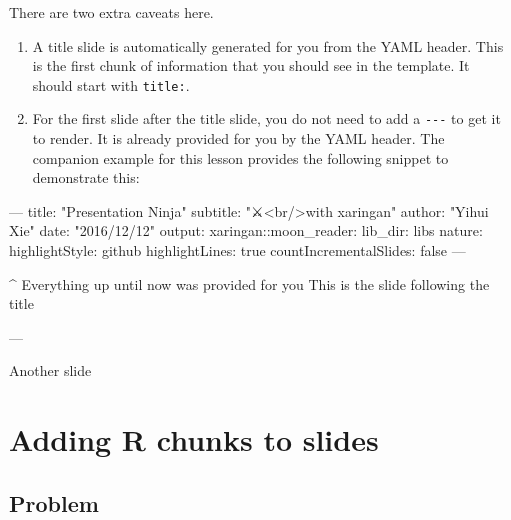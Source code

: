 \documentclass[]{book}
\newenvironment{Shaded}{\begin{snugshade}}{\end{snugshade}}
\newcommand{\ExtensionTok}[1]{#1}
\newcommand{\NormalTok}[1]{#1}
\newcommand{\StringTok}[1]{\textcolor[rgb]{0.31,0.60,0.02}{#1}}
\theoremstyle{definition}
\theoremstyle{definition}
\theoremstyle{definition}
\theoremstyle{remark}
\begin{document}
There are two extra caveats here.

\begin{enumerate}
\def\labelenumi{\arabic{enumi})}
\item
  A title slide is automatically generated for you from the YAML header.
  This is the first chunk of information that you should see in the
  template. It should start with \texttt{title:}.
\item
  For the first slide after the title slide, you do not need to add a
  \texttt{-\/-\/-} to get it to render. It is already provided for you
  by the YAML header. The companion example for this lesson provides the
  following snippet to demonstrate this:
\end{enumerate}

\begin{Shaded}
\begin{Highlighting}[]
\ExtensionTok{---}
\ExtensionTok{title}\NormalTok{: }\StringTok{"Presentation Ninja"}
\ExtensionTok{subtitle}\NormalTok{: }\StringTok{"⚔<br/>with xaringan"}
\ExtensionTok{author}\NormalTok{: }\StringTok{"Yihui Xie"}
\ExtensionTok{date}\NormalTok{: }\StringTok{"2016/12/12"}
\ExtensionTok{output}\NormalTok{:}
  \ExtensionTok{xaringan}\NormalTok{::moon_reader:}
    \ExtensionTok{lib_dir}\NormalTok{: libs}
    \ExtensionTok{nature}\NormalTok{:}
      \ExtensionTok{highlightStyle}\NormalTok{: github}
      \ExtensionTok{highlightLines}\NormalTok{: true}
      \ExtensionTok{countIncrementalSlides}\NormalTok{: false}
\ExtensionTok{---}

\NormalTok{^ }\ExtensionTok{Everything}\NormalTok{ up until now was provided for you}
\ExtensionTok{This}\NormalTok{ is the slide following the title}

\ExtensionTok{---}

\ExtensionTok{Another}\NormalTok{ slide}
\end{Highlighting}
\end{Shaded}

\hypertarget{adding-r-chunks-to-slides}{%
\chapter{Adding R chunks to slides}\label{adding-r-chunks-to-slides}}

\hypertarget{problem-3}{%
\section{Problem}\label{problem-3}}
\end{document}
